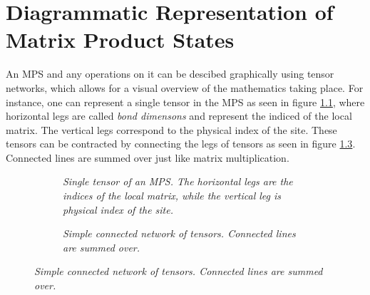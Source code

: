 \chapter{Diagrammatic Representation of Matrix Product States} \label{chap:diagrams}

An MPS and any operations on it can be descibed graphically using tensor networks, which allows for a visual overview of the mathematics taking place. For instance, one can represent a single tensor in the MPS as seen in figure \ref{fig:singleTensor}, where horizontal legs are called \textit{bond dimensons} and represent the indiced of the local matrix. The vertical legs correspond to the physical index of the site. These tensors can be contracted by connecting the legs of tensors as seen in figure \ref{fig:simpleConnected}. Connected lines are summed over just like matrix multiplication. 

\begin{figure}[h!]
	\centering
	\begin{subfigure}{\linewidth}
		\centering
		
		\caption{\textit{Single tensor of an MPS. The horizontal legs are the indices of the local matrix, while the vertical leg is physical index of the site.}}
		\label{fig:singleTensor}
	\end{subfigure}
	\begin{subfigure}{\linewidth}
		\centering
		
		\caption{\textit{Simple connected network of tensors. Connected lines are summed over.}}
		\label{fig:simpleConnected}
	\end{subfigure}
	
\end{figure}
